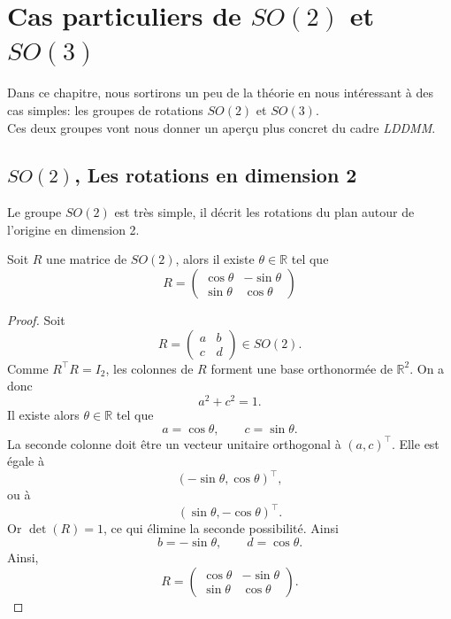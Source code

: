 \documentclass[12pt]{report}
\begin{document}
\chapter{Cas particuliers de \texorpdfstring{$SO(2)$}{SO (2)} et \texorpdfstring{$SO(3)$}{SO (3)}}\label{chap:SO2-SO3}

Dans ce chapitre, nous sortirons un peu de la théorie en nous intéressant à des cas simples: les groupes de rotations $SO(2)$ et $SO(3)$.\\
Ces deux groupes vont nous donner un aperçu plus concret du cadre \textit{LDDMM}\@.

\section{\texorpdfstring{$SO(2)$}{SO (2)}, Les rotations en dimension 2}

Le groupe $SO(2)$ est très simple, il décrit les rotations du plan autour de l'origine en dimension 2.

\begin{proposition}\label{prop:forme-SO(2)}
Soit $R$ une matrice de $SO(2)$, alors il existe $\theta\in\mathbb{R}$ tel que
\[
R=\begin{pmatrix}\cos\theta &-\sin\theta \\\sin\theta &\cos\theta\end{pmatrix}
\]
\end{proposition}

\begin{proof}
Soit
\[
R=\begin{pmatrix}a & b\\c & d\end{pmatrix}\in SO(2).
\]
Comme $R^{\top}R=I_2$, les colonnes de $R$ forment une base orthonormée de $\mathbb{R}^2$. On a donc
\[
a^2+c^2=1.
\]
Il existe alors $\theta\in\mathbb{R}$ tel que
\[
a=\cos\theta,\qquad c=\sin\theta.
\]
La seconde colonne doit être un vecteur unitaire orthogonal à ${(a,c)}^{\top}$. Elle est égale à
\[
{(-\sin\theta,\cos\theta)}^{\top},
\]
ou à
\[
{(\sin\theta,-\cos\theta)}^{\top}.
\]
Or $\det(R)=1$, ce qui élimine la seconde possibilité. Ainsi
\[
b=-\sin\theta,\qquad d=\cos\theta.
\]
Ainsi,
\[
R=\begin{pmatrix}\cos\theta & -\sin\theta\\\sin\theta & \cos\theta\end{pmatrix}.
\]
\end{proof}
\end{document}
